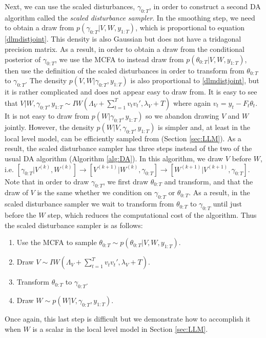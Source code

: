 \documentclass{article}
\begin{document}
Next, we can use the scaled disturbances, $\gamma_{0:T}$, in order to construct a second DA algorithm called the {\it scaled disturbance sampler}. In the smoothing step, we need to obtain a draw from $p(\gamma_{0:T}|V,W,y_{1:T})$, which is proportional to equation \eqref{dlmdistjoint}. This density is also Gaussian but does not have a tridagonal precision matrix. As a result, in order to obtain a draw from the conditional posterior of $\gamma_{0:T}$, we use the MCFA to instead draw from $p(\theta_{0:T}|V,W,y_{1:T})$, then use the definition of the scaled disturbances in order to transform from $\theta_{0:T}$ to $\gamma_{0:T}$. The density $p(V,W|\gamma_{0:T},y_{1:T})$ is also proportional to \eqref{dlmdistjoint}, but it is rather complicated and does not appear easy to draw from. It is easy to see that $V|W,\gamma_{0:T},y_{1:T} \sim IW\left(\Lambda_V + \sum_{t=1}^Tv_tv_t',\lambda_V + T\right)$ where again $v_t = y_t - F_t\theta_t$. It is not easy to draw from $p(W|\gamma_{0:T},y_{1:T})$ so we abandon drawing $V$ and $W$ jointly. However, the density $p(W|V,\gamma_{0:T},y_{1:T})$ is simpler and, at least in the local level model, can be efficiently sampled from (Section \ref{sec:LLM}). As a result, the scaled disturbance sampler has three steps instead of the two of the usual DA algorithm (Algorithm \ref{alg:DA}). In this algorithm, we draw $V$ before $W$, i.e. $[\gamma_{0:T}|V^{(k)},W^{(k)}] \to [V^{(k+1)}|W^{(k)},\gamma_{0:T}] \to [W^{(k+1)}|V^{(k+1)},\gamma_{0:T}]$. Note that in order to draw $\gamma_{0:T}$, we first draw $\theta_{0:T}$ and transform, and that the draw of $V$ is the same whether we condition on $\gamma_{0:T}$ or $\theta_{0:T}$. As a result, in the scaled disturbance sampler we wait to transform from $\theta_{0:T}$ to $\gamma_{0:T}$ until just before the $W$ step, which reduces the computational cost of the algorithm. Thus the scaled disturbance sampler is as follows:
\begin{enumerate}
\item Use the MCFA to sample $\theta_{0:T} \sim p(\theta_{0:T}|V,W,y_{1:T})$.
\item Draw $V \sim IW\left(\Lambda_V + \sum_{t=1}^Tv_tv_t',\lambda_V + T\right)$.
\item Transform $\theta_{0:T}$ to $\gamma_{0:T}$.
\item Draw $W \sim p(W|V,\gamma_{0:T},y_{1:T})$.
\end{enumerate}
Once again, this last step is difficult but we demonstrate how to accomplish it when $W$ is a scalar in the local level model in Section \ref{sec:LLM}.
\end{document}
